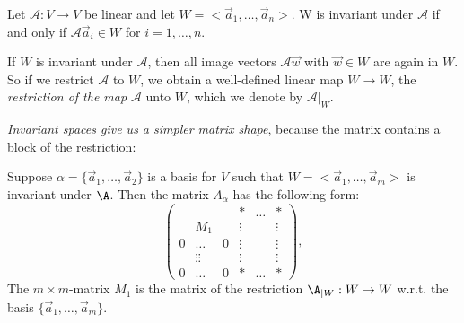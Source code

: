 \begin{theorem}
    Let $\mathcal{A}: V \to V$ be linear and let $W = <\vec{a}_1, \dots, \vec{a}_n>$. W is invariant under $\mathcal{A}$ if
    and only if $\mathcal{A}\vec{a}_i \in W$ for $i = 1,\dots,n$.
\end{theorem}

\begin{definition}
    If $W$ is invariant under $\mathcal{A}$, then all image vectors $\mathcal{A}\vec{w}$ with $\vec{w} \in W$ are again in $W$.
    So if we restrict $\mathcal{A}$ to $W$, we obtain a well-defined linear map $W \to W$, the \emph{restriction of the map} $\mathcal{A}$
    unto $W$, which we denote by $\mathcal{A}|_W$.
\end{definition}

\emph{Invariant spaces give us a simpler matrix shape}, because the matrix contains a block of the restriction:

\begin{theorem}
    Suppose $\alpha = \{\vec{a}_1, \dots, \vec{a}_2\}$ is a basis for $V$ such that $W = <\vec{a}_1, \dots, \vec{a}_m>$ is invariant under $\A$. Then the matrix $A_\alpha$ has the following form:
    $$\begin{pmatrix} & & & * & \dots & * \\
            & M_1 & &  \vdots & & \vdots \\
        0 & \dots & 0 & \vdots & & \vdots \\
          & \vdots\vdots & & \vdots & & \vdots \\
    0 & \dots & 0 & * & \dots & * \end{pmatrix},$$
    The $m \times m$-matrix $M_1$ is the matrix of the restriction $\A_{|W}: W \to W$ w.r.t. the basis $\{\vec{a}_1, \dots, \vec{a}_m\}$.
\end{theorem}


